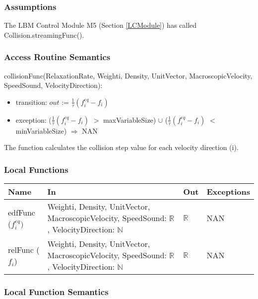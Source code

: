 \documentclass[12pt, titlepage]{article}
\begin{document}
\subsubsection{Assumptions}

The LBM Control Module M5 (Section \ref{LCModule}) has called Collision.streamingFunc().

\subsubsection{Access Routine Semantics}

\noindent collisionFunc(RelaxationRate, Weighti, Density, UnitVector, MacroscopicVelocity, SpeedSound, VelocityDirection):
\begin{itemize}
	\item transition: $out$ := $\frac{1}{\tau}(f_{i}^{eq}-f_{i})$
	\item exception: ($\frac{1}{\tau}(f_{i}^{eq}-f_{i})$ $>$ maxVariableSize) $\cup$ ($\frac{1}{\tau}(f_{i}^{eq}-f_{i})$ $<$ minVariableSize) $\Rightarrow$ NAN
\end{itemize}


The function calculates the collision step value for each velocity direction (i).

\subsubsection{Local Functions}

\begin{center}
	\begin{tabular}{p{2cm} p{3cm} p{4cm} p{2cm}}
		\hline
		\textbf{Name} & \textbf{In} & \textbf{Out} & \textbf{Exceptions} \\
		\hline
		edfFunc ($f_{i}^{eq})$ & Weighti, Density, UnitVector, MacroscopicVelocity, SpeedSound: $\mathbb{R}$, VelocityDirection: $\mathbb{N}$ & $\mathbb{R}$ & NAN \\
		relFunc ($f_{i}$) & Weighti, Density, UnitVector, MacroscopicVelocity, SpeedSound: $\mathbb{R}$, VelocityDirection: $\mathbb{N}$ & $\mathbb{R}$  & NAN \\
		\hline
	\end{tabular}
\end{center}

\subsubsection{Local Function Semantics}
\end{document}
